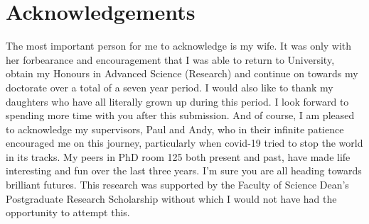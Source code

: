 \documentclass[../Thesis.tex]{subfiles}
\begin{document}
\chapter{Acknowledgements}


The most important person for me to acknowledge is my wife. 
It was only with her forbearance and encouragement that I was able to return to University, obtain my Honours in Advanced Science (Research) and continue on towards my doctorate over a total of a seven year period.
I would also like to thank my daughters who have all literally grown up during this period.
I look forward to spending more time with you after this submission.
And of course, I am pleased to acknowledge my supervisors, Paul and Andy, who in their infinite patience encouraged me on this journey, particularly when covid-19 tried to stop the world in its tracks.
My peers in PhD room 125 both present and past, have made life interesting and fun over the last three years.
I'm sure you are all heading towards brilliant futures.
This research was supported by the Faculty of Science Dean's Postgraduate Research Scholarship without which I would not have had the opportunity to attempt this.
\end{document}
